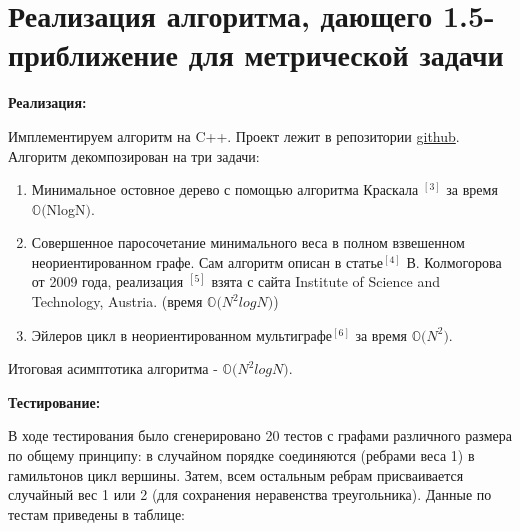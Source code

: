\documentclass[14pt]{article}
\begin{document}
	
	
	\section{Реализация алгоритма, дающего 1.5-приближение для метрической задачи}
	
	\begin{center}
		\textbf{\large Реализация:}
	\end{center}
	
	Имплементируем алгоритм на C++. Проект лежит в репозитории \href{https://github.com/JerryCh0/discrete-optimization-course-homework}{github}.
	Алгоритм декомпозирован на три задачи:
	\begin{enumerate}
		\item Минимальное остовное дерево с помощью алгоритма Краскала \hyperref[Kruskal]{$^{[3]}$} за время $\mathbb{O(}$NlogN$)$. 
		\item Совершенное паросочетание минимального веса в полном взвешенном неориентированном графе. Сам алгоритм описан в статье\hyperref[kolm]{$^{[4]}$} В. Колмогорова от 2009 года, реализация \hyperref[realisation]{$^{[5]}$} взята с сайта Institute of Science and Technology, Austria. (время $\mathbb{O(}N^2logN)$)
		\item Эйлеров цикл в неориентированном мультиграфе\hyperref[euler]{$^{[6]}$} за время $\mathbb{O(}N^2)$.
	\end{enumerate}
	
	Итоговая асимптотика алгоритма - $\mathbb{O(}N^2logN)$.
	
	\begin{center}
		\textbf{\large Тестирование:}
	\end{center} 
	
	В ходе тестирования было сгенерировано 20 тестов с графами различного размера по общему принципу: в случайном порядке соединяются (ребрами веса 1) в гамильтонов цикл вершины. Затем, всем остальным ребрам присваивается случайный вес 1 или 2 (для сохранения неравенства треугольника). Данные по тестам приведены в таблице:
	
	$                  $
	
\end{document}

